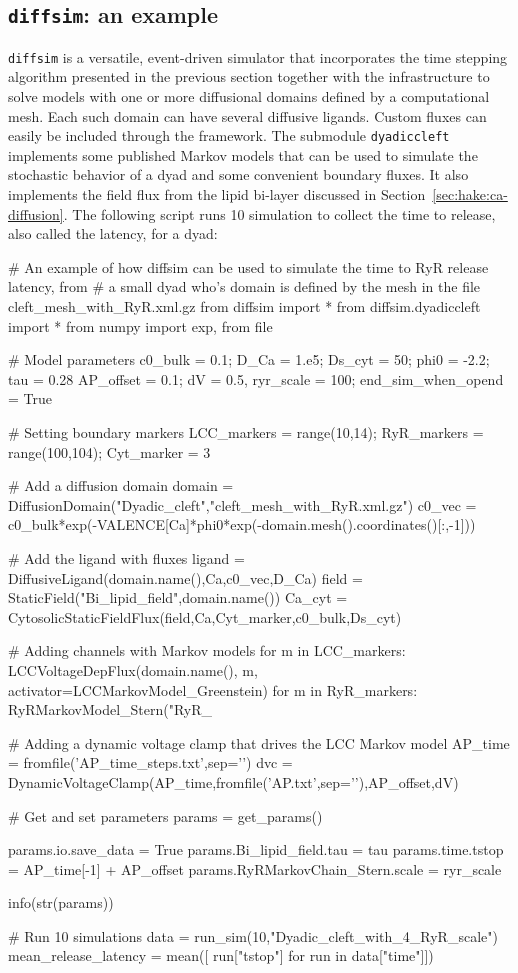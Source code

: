 \subsection*{\texttt{diffsim}: an example}
 
\texttt{diffsim} is a versatile, event-driven simulator that
incorporates the time stepping algorithm presented in the previous
section together with the infrastructure to solve models with one or
more diffusional domains defined by a computational mesh. Each such
domain can have several diffusive ligands. Custom fluxes can easily be
included through the framework. The submodule \texttt{dyadiccleft}
implements some published Markov models that can be used to simulate
the stochastic behavior of a dyad and some convenient boundary
fluxes. It also implements the field flux from the lipid bi-layer
discussed in Section~\ref{sec:hake:ca-diffusion}. The following script
runs 10 simulation to collect the time to release, also called the
latency, for a dyad:
\begin{python}
# An example of how diffsim can be used to simulate the time to RyR release latency, from
# a small dyad who's domain is defined by the mesh in the file cleft_mesh_with_RyR.xml.gz
from diffsim import *
from diffsim.dyadiccleft import *
from numpy import exp, from file

# Model parameters
c0_bulk = 0.1; D_Ca = 1.e5; Ds_cyt = 50; phi0 = -2.2; tau = 0.28
AP_offset = 0.1; dV = 0.5, ryr_scale = 100; end_sim_when_opend = True

# Setting boundary markers
LCC_markers = range(10,14); RyR_markers = range(100,104); Cyt_marker = 3

# Add a diffusion domain
domain = DiffusionDomain("Dyadic_cleft","cleft_mesh_with_RyR.xml.gz")
c0_vec = c0_bulk*exp(-VALENCE[Ca]*phi0*exp(-domain.mesh().coordinates()[:,-1]))

# Add the ligand with fluxes
ligand = DiffusiveLigand(domain.name(),Ca,c0_vec,D_Ca)
field  = StaticField("Bi_lipid_field",domain.name())
Ca_cyt = CytosolicStaticFieldFlux(field,Ca,Cyt_marker,c0_bulk,Ds_cyt)

# Adding channels with Markov models
for m in LCC_markers:
    LCCVoltageDepFlux(domain.name(), m, activator=LCCMarkovModel_Greenstein)
for m in RyR_markers:
    RyRMarkovModel_Stern("RyR_%

# Adding a dynamic voltage clamp that drives the LCC Markov model
AP_time = fromfile('AP_time_steps.txt',sep='\n')
dvc = DynamicVoltageClamp(AP_time,fromfile('AP.txt',sep='\n'),AP_offset,dV)

# Get and set parameters
params = get_params()

params.io.save_data = True
params.Bi_lipid_field.tau = tau
params.time.tstop = AP_time[-1] + AP_offset
params.RyRMarkovChain_Stern.scale = ryr_scale

info(str(params))

# Run 10  simulations
data = run_sim(10,"Dyadic_cleft_with_4_RyR_scale")
mean_release_latency = mean([ run["tstop"] for run in data["time"]])
\end{python}
